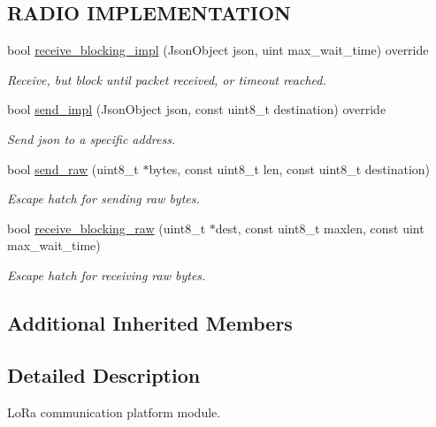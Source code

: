 \subsection*{R\+A\+D\+IO I\+M\+P\+L\+E\+M\+E\+N\+T\+A\+T\+I\+ON}
\begin{DoxyCompactItemize}
\item 
bool \hyperlink{class_loom___lo_ra_a62143785c09b5e48a31cc3643398d1f8}{receive\+\_\+blocking\+\_\+impl} (Json\+Object json, uint max\+\_\+wait\+\_\+time) override
\begin{DoxyCompactList}\small\item\em Receive, but block until packet received, or timeout reached. \end{DoxyCompactList}\item 
bool \hyperlink{class_loom___lo_ra_ac349e4d3e3b6408c83b9c8020c501023}{send\+\_\+impl} (Json\+Object json, const uint8\+\_\+t destination) override
\begin{DoxyCompactList}\small\item\em Send json to a specific address. \end{DoxyCompactList}\item 
bool \hyperlink{class_loom___lo_ra_afb53e94ac55d435a460712d93f38404a}{send\+\_\+raw} (uint8\+\_\+t $\ast$bytes, const uint8\+\_\+t len, const uint8\+\_\+t destination)
\begin{DoxyCompactList}\small\item\em Escape hatch for sending raw bytes. \end{DoxyCompactList}\item 
bool \hyperlink{class_loom___lo_ra_a57b7b1404ae6f30fd217da5da15731b3}{receive\+\_\+blocking\+\_\+raw} (uint8\+\_\+t $\ast$dest, const uint8\+\_\+t maxlen, const uint max\+\_\+wait\+\_\+time)
\begin{DoxyCompactList}\small\item\em Escape hatch for receiving raw bytes. \end{DoxyCompactList}\end{DoxyCompactItemize}
\subsection*{Additional Inherited Members}


\subsection{Detailed Description}
Lo\+Ra communication platform module. 

